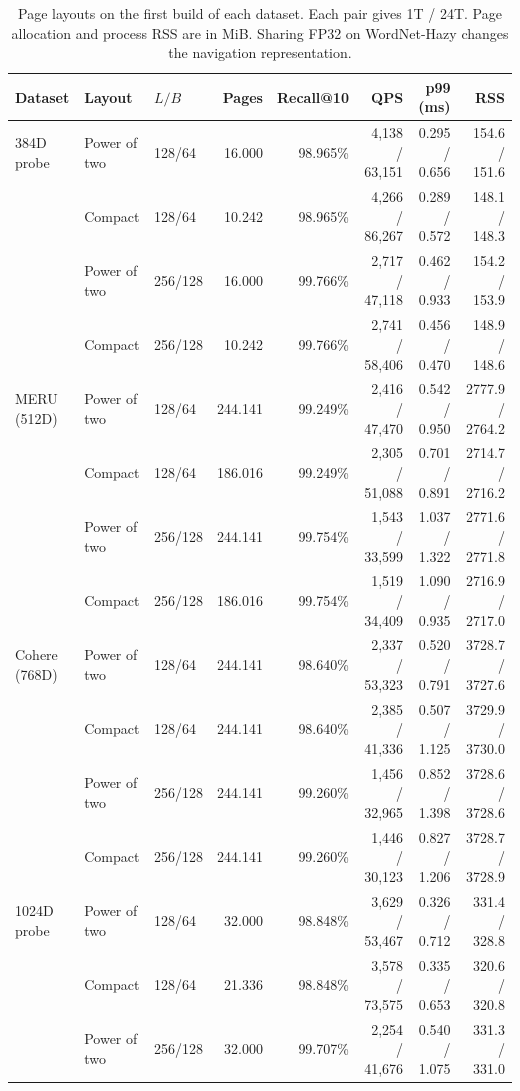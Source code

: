 \begin{table}[t]
  \centering
  \caption{Page layouts on the first build of each dataset. Each pair gives 1T / 24T. Page allocation and process RSS are in MiB. Sharing FP32 on WordNet-Hazy changes the navigation representation.}
  \label{tab:layout_sweep}
  \small\setlength{\tabcolsep}{5pt}
  \begin{tabular}{@{}lllrrrrr@{}}
  \toprule
  Dataset & Layout & $L/B$ & Pages & Recall@10 & QPS & p99 (ms) & RSS \\
  \midrule
  384D probe & Power of two & 128/64 & 16.000 & 98.965\% & 4,138 / 63,151 & 0.295 / 0.656 & 154.6 / 151.6 \\
   & Compact & 128/64 & 10.242 & 98.965\% & 4,266 / 86,267 & 0.289 / 0.572 & 148.1 / 148.3 \\
   & Power of two & 256/128 & 16.000 & 99.766\% & 2,717 / 47,118 & 0.462 / 0.933 & 154.2 / 153.9 \\
   & Compact & 256/128 & 10.242 & 99.766\% & 2,741 / 58,406 & 0.456 / 0.470 & 148.9 / 148.6 \\
  \midrule
  MERU (512D) & Power of two & 128/64 & 244.141 & 99.249\% & 2,416 / 47,470 & 0.542 / 0.950 & 2777.9 / 2764.2 \\
   & Compact & 128/64 & 186.016 & 99.249\% & 2,305 / 51,088 & 0.701 / 0.891 & 2714.7 / 2716.2 \\
   & Power of two & 256/128 & 244.141 & 99.754\% & 1,543 / 33,599 & 1.037 / 1.322 & 2771.6 / 2771.8 \\
   & Compact & 256/128 & 186.016 & 99.754\% & 1,519 / 34,409 & 1.090 / 0.935 & 2716.9 / 2717.0 \\
  \midrule
  Cohere (768D) & Power of two & 128/64 & 244.141 & 98.640\% & 2,337 / 53,323 & 0.520 / 0.791 & 3728.7 / 3727.6 \\
   & Compact & 128/64 & 244.141 & 98.640\% & 2,385 / 41,336 & 0.507 / 1.125 & 3729.9 / 3730.0 \\
   & Power of two & 256/128 & 244.141 & 99.260\% & 1,456 / 32,965 & 0.852 / 1.398 & 3728.6 / 3728.6 \\
   & Compact & 256/128 & 244.141 & 99.260\% & 1,446 / 30,123 & 0.827 / 1.206 & 3728.7 / 3728.9 \\
  \midrule
  1024D probe & Power of two & 128/64 & 32.000 & 98.848\% & 3,629 / 53,467 & 0.326 / 0.712 & 331.4 / 328.8 \\
   & Compact & 128/64 & 21.336 & 98.848\% & 3,578 / 73,575 & 0.335 / 0.653 & 320.6 / 320.8 \\
   & Power of two & 256/128 & 32.000 & 99.707\% & 2,254 / 41,676 & 0.540 / 1.075 & 331.3 / 331.0 \\

\end{tabular}
\end{table}
